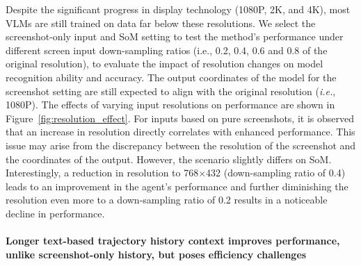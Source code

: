 Despite the significant progress in display technology (1080P, 2K, and 4K), most VLMs are still trained on data far below these resolutions. 
We select the screenshot-only input and SoM setting to test the method's performance under different screen input down-sampling ratios (i.e., 0.2, 0.4, 0.6 and 0.8 of the original resolution), to evaluate the impact of resolution changes on model recognition ability and accuracy.
The output coordinates of the model for the screenshot setting are still expected to align with the original resolution (\textit{i.e.}, 1080P).
The effects of varying input resolutions on performance are shown in Figure~\ref{fig:resolution_effect}. 
For inputs based on pure screenshots, it is observed that an increase in resolution directly correlates with enhanced performance. 
This issue may arise from the discrepancy between the resolution of the screenshot and the coordinates of the output.
However, the scenario slightly differs on SoM.
Interestingly, a reduction in resolution to 768$\times$432 (down-sampling ratio of 0.4) leads to an improvement 
in the agent's performance and further diminishing the resolution even more to a down-sampling ratio of 0.2 results in a noticeable decline in performance. 

\paragraph{Longer text-based trajectory history context improves performance, unlike screenshot-only history, but poses efficiency challenges}

